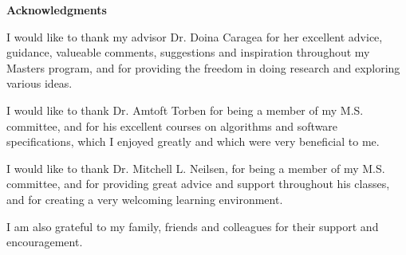 
\newpage
\vspace*{0.9cm}
\begin{center}
{\bf \Huge Acknowledgments}
\end{center}

\setlength{\baselineskip}{0.8cm}




I would like to thank my advisor Dr. Doina Caragea for her excellent advice, guidance, valueable comments, suggestions and inspiration throughout my Masters program, and for providing the freedom in doing research and exploring various ideas.  

I would like to thank Dr. Amtoft Torben for being a member of my  M.S. committee, and for his excellent courses on algorithms and software specifications, which I enjoyed greatly and which were very beneficial to me. 

I would like to thank Dr. Mitchell L. Neilsen, for being a member of my M.S. committee, and for providing great advice and support throughout his classes, and for creating a very welcoming learning environment. 

I am also grateful to my family, friends and colleagues for their support and encouragement.

